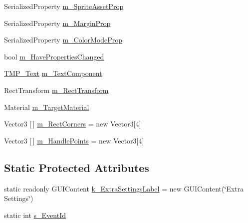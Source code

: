 \begin{DoxyCompactItemize}
\item 
Serialized\+Property \mbox{\hyperlink{class_t_m_pro_1_1_editor_utilities_1_1_t_m_p___base_editor_panel_a4151a0308bd63e2ad819d528673013e3}{m\+\_\+\+Sprite\+Asset\+Prop}}
\item 
Serialized\+Property \mbox{\hyperlink{class_t_m_pro_1_1_editor_utilities_1_1_t_m_p___base_editor_panel_a60d160f33776dcb1253bf4def28c8a0a}{m\+\_\+\+Margin\+Prop}}
\item 
Serialized\+Property \mbox{\hyperlink{class_t_m_pro_1_1_editor_utilities_1_1_t_m_p___base_editor_panel_a2d2d5d90679b96671985213c253f4cca}{m\+\_\+\+Color\+Mode\+Prop}}
\item 
bool \mbox{\hyperlink{class_t_m_pro_1_1_editor_utilities_1_1_t_m_p___base_editor_panel_abbd15aa0e10736b4a9e47dfaa0df9c73}{m\+\_\+\+Have\+Properties\+Changed}}
\item 
\mbox{\hyperlink{class_t_m_pro_1_1_t_m_p___text}{T\+M\+P\+\_\+\+Text}} \mbox{\hyperlink{class_t_m_pro_1_1_editor_utilities_1_1_t_m_p___base_editor_panel_ae2eb5a3fd11e8afb676258b7e6907cad}{m\+\_\+\+Text\+Component}}
\item 
Rect\+Transform \mbox{\hyperlink{class_t_m_pro_1_1_editor_utilities_1_1_t_m_p___base_editor_panel_a264301b690ec1bf59740cb33d3e30b63}{m\+\_\+\+Rect\+Transform}}
\item 
Material \mbox{\hyperlink{class_t_m_pro_1_1_editor_utilities_1_1_t_m_p___base_editor_panel_ad6ba4fbdb3f5bc17081161984840bcc7}{m\+\_\+\+Target\+Material}}
\item 
Vector3 \mbox{[}$\,$\mbox{]} \mbox{\hyperlink{class_t_m_pro_1_1_editor_utilities_1_1_t_m_p___base_editor_panel_ab5d322bc4c1e4492c84e00befd71c34e}{m\+\_\+\+Rect\+Corners}} = new Vector3\mbox{[}4\mbox{]}
\item 
Vector3 \mbox{[}$\,$\mbox{]} \mbox{\hyperlink{class_t_m_pro_1_1_editor_utilities_1_1_t_m_p___base_editor_panel_a95ee2a7777950138e4c4484d3b4b8b1a}{m\+\_\+\+Handle\+Points}} = new Vector3\mbox{[}4\mbox{]}
\end{DoxyCompactItemize}
\subsection*{Static Protected Attributes}
\begin{DoxyCompactItemize}
\item 
static readonly G\+U\+I\+Content \mbox{\hyperlink{class_t_m_pro_1_1_editor_utilities_1_1_t_m_p___base_editor_panel_a578f5582bd20131144ec9ccc6abbce3a}{k\+\_\+\+Extra\+Settings\+Label}} = new G\+U\+I\+Content(\char`\"{}Extra Settings\char`\"{})
\item 
static int \mbox{\hyperlink{class_t_m_pro_1_1_editor_utilities_1_1_t_m_p___base_editor_panel_a0e4526b6887383493c626fa6810560fe}{s\+\_\+\+Event\+Id}}
\end{DoxyCompactItemize}


